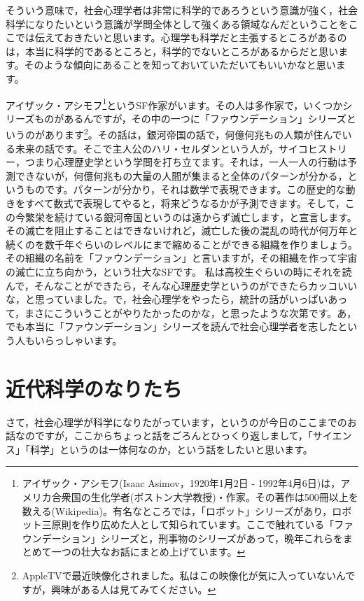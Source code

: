 \documentclass{ltjsbook}
\begin{document}
そういう意味で，社会心理学者は非常に科学的であろうという意識が強く，社会科学になりたいという意識が学問全体として強くある領域なんだということをここでは伝えておきたいと思います。心理学も科学だと主張するところがあるのは，本当に科学的であるところと，科学的でないところがあるからだと思います。そのような傾向にあることを知っておいていただいてもいいかなと思います。

\begin{tcolorbox}[title = 余談]
アイザック・アシモフ\footnote{アイザック・アシモフ(Isaac Asimov，1920年1月2日 - 1992年4月6日)は，アメリカ合衆国の生化学者(ボストン大学教授)・作家。その著作は500冊以上を数える(Wikipedia)。有名なところでは，「ロボット」シリーズがあり，ロボット三原則を作り広めた人として知られています。ここで触れている「ファウンデーション」シリーズと，刑事物のシリーズがあって，晩年これらをまとめて一つの壮大なお話にまとめ上げています。}というSF作家がいます。その人は多作家で，いくつかシリーズものがあるんですが，その中の一つに「ファウンデーション」シリーズというのがあります\footnote{AppleTVで最近映像化されました。私はこの映像化が気に入っていないんですが，興味がある人は見てみてください。}。その話は，銀河帝国の話で，何億何兆もの人類が住んでいる未来の話です。そこで主人公のハリ・セルダンという人が，サイコヒストリー，つまり心理歴史学という学問を打ち立てます。それは，一人一人の行動は予測できないが，何億何兆もの大量の人間が集まると全体のパターンが分かる，というものです。パターンが分かり，それは数学で表現できます。この歴史的な動きをすべて数式で表現してやると，将来どうなるかが予測できます。そして，この今繁栄を続けている銀河帝国というのは遠からず滅亡します，と宣言します。その滅亡を阻止することはできないけれど，滅亡した後の混乱の時代が何万年と続くのを数千年ぐらいのレベルにまで縮めることができる組織を作りましょう。その組織の名前を「ファウンデーション」と言いますが，その組織を作って宇宙の滅亡に立ち向かう，という壮大なSFです。
私は高校生ぐらいの時にそれを読んで，そんなことができたら，そんな心理歴史学というのができたらカッコいいな，と思っていました。で，社会心理学をやったら，統計の話がいっぱいあって，まさにこういうことがやりたかったのかな，と思ったような次第です。あ，でも本当に「ファウンデーション」シリーズを読んで社会心理学者を志したという人もいらっしゃいます。
\end{tcolorbox}

\section{近代科学のなりたち}
さて，社会心理学が科学になりたがっています，というのが今日のここまでのお話なのですが，ここからちょっと話をごろんとひっくり返しまして，「サイエンス」「科学」というのは一体何なのか，という話をしたいと思います。
\end{document}
